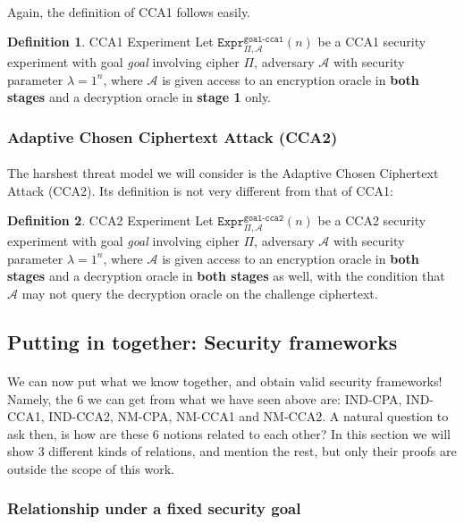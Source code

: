 \documentclass{article}
\theoremstyle{definition}
\newtheorem{definition}{Definition}[section]
\newcommand{\A}{\mathcal{A}}
\newcommand{\Expr}[2]{\texttt{Expr}^{\texttt{#1}}_{#2}}
\begin{document}
\paragraph{} Again, the definition of CCA1 follows easily.
\begin{definition}{CCA1 Experiment}
  Let $\Expr{goal-cca1}{\Pi, \A}(n)$ be a CCA1 security experiment with goal
  \textit{goal} involving
  cipher $\Pi$, adversary $\A$ with security parameter $\lambda = 1^n$, where
  $\A$ is given access to an encryption oracle in \textbf{both stages} and a
  decryption oracle in \textbf{stage 1} only.
\end{definition}
\subsubsection{Adaptive Chosen Ciphertext Attack (CCA2)}
\paragraph{} The harshest threat model we will consider is the Adaptive Chosen
Ciphertext Attack (CCA2). Its definition is not very different from that of CCA1:
\begin{definition}{CCA2 Experiment}
  Let $\Expr{goal-cca2}{\Pi, \A}(n)$ be a CCA2 security experiment with goal
  \textit{goal} involving
  cipher $\Pi$, adversary $\A$ with security parameter $\lambda = 1^n$, where
  $\A$ is given access to an encryption oracle in \textbf{both stages} and a
  decryption oracle in \textbf{both stages} as well, with the condition that
  $\A$ may not query the decryption oracle on the challenge ciphertext.
\end{definition}
\subsection{Putting in together: Security frameworks}
\paragraph{} We can now put what we know together, and obtain valid security
frameworks! Namely, the 6 we can get from what we have seen above are: IND-CPA,
IND-CCA1, IND-CCA2, NM-CPA, NM-CCA1 and NM-CCA2. A natural question to ask then,
is how are these 6 notions related to each other? In this section we will show 3
different kinds of relations, and mention the rest, but only their proofs are
outside the scope of this work.
\subsubsection{Relationship under a fixed security goal}
\end{document}
